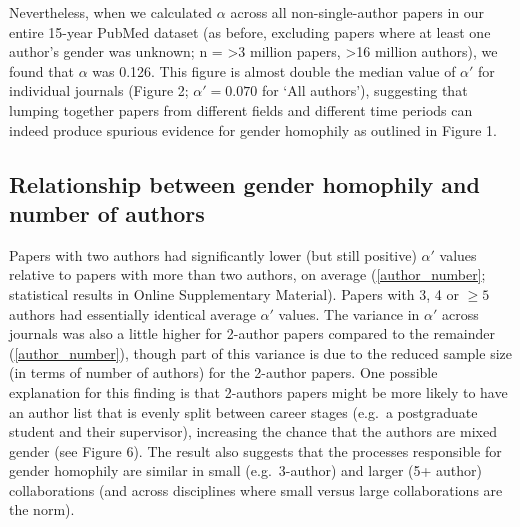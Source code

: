 \documentclass[12pt,]{article}
\begin{document}
Nevertheless, when we calculated \(\alpha\) across all non-single-author
papers in our entire 15-year PubMed dataset (as before, excluding papers
where at least one author's gender was unknown; n = \textgreater{}3
million papers, \textgreater{}16 million authors), we found that
\(\alpha\) was 0.126. This figure is almost double the median value of
\(\alpha'\) for individual journals (Figure 2; \(\alpha' = 0.070\) for
`All authors'), suggesting that lumping together papers from different
fields and different time periods can indeed produce spurious evidence
for gender homophily as outlined in Figure 1.

\hypertarget{relationship-between-gender-homophily-and-number-of-authors}{%
\subsection{Relationship between gender homophily and number of
authors}\label{relationship-between-gender-homophily-and-number-of-authors}}

Papers with two authors had significantly lower (but still positive)
\(\alpha'\) values relative to papers with more than two authors, on
average (\autoref{author_number}; statistical results in Online
Supplementary Material). Papers with 3, 4 or \(\ge5\) authors had
essentially identical average \(\alpha'\) values. The variance in
\(\alpha'\) across journals was also a little higher for 2-author papers
compared to the remainder (\autoref{author_number}), though part of this
variance is due to the reduced sample size (in terms of number of
authors) for the 2-author papers. One possible explanation for this
finding is that 2-authors papers might be more likely to have an author
list that is evenly split between career stages (e.g.~a postgraduate
student and their supervisor), increasing the chance that the authors
are mixed gender (see Figure 6). The result also suggests that the
processes responsible for gender homophily are similar in small
(e.g.~3-author) and larger (5+ author) collaborations (and across
disciplines where small versus large collaborations are the norm).
\end{document}
